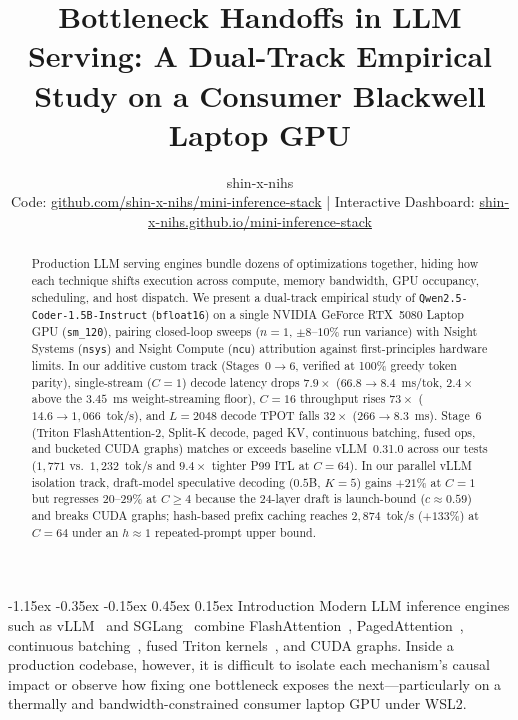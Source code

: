 \documentclass[10pt,twocolumn]{article}
\title{\vspace{-1.5em}\Large\bfseries Bottleneck Handoffs in LLM Serving: A Dual-Track Empirical Study on a Consumer Blackwell Laptop GPU}
\author{\normalsize shin-x-nihs \\[0.2em]
\small Code: \href{https://github.com/shin-x-nihs/mini-inference-stack}{github.com/shin-x-nihs/mini-inference-stack} \quad|\quad
Interactive Dashboard: \href{https://shin-x-nihs.github.io/mini-inference-stack/}{shin-x-nihs.github.io/mini-inference-stack}}
\date{\vspace{-1.5em}}
\makeatletter
\renewcommand\section{\@startsection{section}{1}{\z@}%
  {-1.15ex \@plus -0.35ex \@minus -0.15ex}%
  {0.45ex \@plus 0.15ex}%
  {\normalfont\large\bfseries}}
\newcommand{\code}[1]{\texttt{\small #1}}
\makeatother
\begin{document}
\maketitle

\begin{abstract}
Production LLM serving engines bundle dozens of optimizations together, hiding how each technique shifts execution across compute, memory bandwidth, GPU occupancy, scheduling, and host dispatch. We present a dual-track empirical study of \code{Qwen2.5-Coder-1.5B-Instruct} (\code{bfloat16}) on a single NVIDIA GeForce RTX~5080 Laptop GPU (\code{sm\_120}), pairing closed-loop sweeps ($n{=}1$, $\pm 8$--$10\%$ run variance) with Nsight Systems (\code{nsys}) and Nsight Compute (\code{ncu}) attribution against first-principles hardware limits. In our additive custom track (Stages~0$\rightarrow$6, verified at 100\% greedy token parity), single-stream ($C{=}1$) decode latency drops $7.9\times$ ($66.8 \rightarrow 8.4$~ms/tok, $2.4\times$ above the $3.45$~ms weight-streaming floor), $C{=}16$ throughput rises $73\times$ ($14.6 \rightarrow 1{,}066$~tok/s), and $L{=}2048$ decode TPOT falls $32\times$ ($266 \rightarrow 8.3$~ms). Stage~6 (Triton FlashAttention-2, Split-K decode, paged KV, continuous batching, fused ops, and bucketed CUDA graphs) matches or exceeds baseline vLLM~0.31.0 across our tests ($1{,}771$ vs.\ $1{,}232$~tok/s and $9.4\times$ tighter P99 ITL at $C{=}64$). In our parallel vLLM isolation track, draft-model speculative decoding ($0.5$B, $K{=}5$) gains $+21\%$ at $C{=}1$ but regresses $20$--$29\%$ at $C \ge 4$ because the 24-layer draft is launch-bound ($c \approx 0.59$) and breaks CUDA graphs; hash-based prefix caching reaches $2{,}874$~tok/s ($+133\%$) at $C{=}64$ under an $h \approx 1$ repeated-prompt upper bound.
\end{abstract}

\section{Introduction}
Modern LLM inference engines such as vLLM~\cite{kwon2023vllm} and SGLang~\cite{zheng2024sglang} combine FlashAttention~\cite{dao2022flashattention,dao2024flashattention2}, PagedAttention~\cite{kwon2023vllm}, continuous batching~\cite{yu2022orca}, fused Triton kernels~\cite{tillet2019triton}, and CUDA graphs. Inside a production codebase, however, it is difficult to isolate each mechanism's causal impact or observe how fixing one bottleneck exposes the next---particularly on a thermally and bandwidth-constrained consumer laptop GPU under WSL2.
\end{document}
